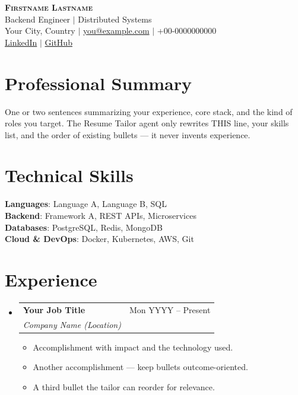 \documentclass[letterpaper,11pt]{article}
\makeatletter
\newcommand{\resumeItem}[1]{\item\small{{#1 \vspace{-2pt}}}}
\newcommand{\resumeSubheading}[4]{
  \vspace{-2pt}\item
    \begin{tabular*}{0.97\textwidth}[t]{l@{\extracolsep{\fill}}r}
      \textbf{#1} & #2 \\
      \textit{\small#3} & \textit{\small #4} \\
    \end{tabular*}\vspace{-7pt}
}
\newcommand{\resumeSubHeadingListStart}{\begin{itemize}[leftmargin=0.15in, label={}]}
\newcommand{\resumeSubHeadingListEnd}{\end{itemize}}
\newcommand{\resumeItemListStart}{\begin{itemize}}
\newcommand{\resumeItemListEnd}{\end{itemize}\vspace{-5pt}}
\makeatother
\begin{document}
\begin{center}
    \textbf{\Huge \scshape Firstname Lastname} \\ \vspace{1pt}
    \small Backend Engineer $|$ Distributed Systems \\ \vspace{1pt}
    Your City, Country $|$
    \href{mailto:you@example.com}{you@example.com} $|$ +00-0000000000 \\ \vspace{1pt}
    \href{https://linkedin.com/in/your-handle}{LinkedIn} $|$
    \href{https://github.com/your-handle}{GitHub}
\end{center}

\section{Professional Summary}
\small{One or two sentences summarizing your experience, core stack, and the kind of roles
you target. The Resume Tailor agent only rewrites THIS line, your skills list, and the order
of existing bullets — it never invents experience.}
\vspace{-4pt}

\section{Technical Skills}
\begin{itemize}[leftmargin=0.15in, label={}]
    \small{\item{
     \textbf{Languages}{: Language A, Language B, SQL} \\
     \textbf{Backend}{: Framework A, REST APIs, Microservices} \\
     \textbf{Databases}{: PostgreSQL, Redis, MongoDB} \\
     \textbf{Cloud \& DevOps}{: Docker, Kubernetes, AWS, Git}
    }}
\end{itemize}
\vspace{-8pt}

\section{Experience}
  \resumeSubHeadingListStart
    \resumeSubheading
      {Your Job Title}{Mon YYYY -- Present}
      {Company Name (Location)}{}
      \resumeItemListStart
        \resumeItem{Accomplishment with impact and the technology used.}
        \resumeItem{Another accomplishment — keep bullets outcome-oriented.}
        \resumeItem{A third bullet the tailor can reorder for relevance.}
      \resumeItemListEnd
  \resumeSubHeadingListEnd
\end{document}
